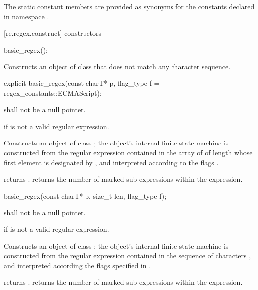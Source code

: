 \pnum
{}%
The static constant members are provided as synonyms for the constants
declared in namespace .

[re.regex.construct]{ constructors}

%
\begin{itemdecl}
basic_regex();
\end{itemdecl}

\begin{itemdescr}
\pnum
\effects  Constructs an object of class  that
does not match any character sequence.
\end{itemdescr}

%
\begin{itemdecl}
explicit basic_regex(const charT* p, flag_type f = regex_constants::ECMAScript);
\end{itemdecl}

\begin{itemdescr}
\pnum
\requires  {} shall not be a null pointer. 

\pnum
\throws  {} if  is not a valid regular expression. 

\pnum
\effects  Constructs an object of class ; the object's
internal finite state machine is constructed from the regular
expression contained in the array of  of length
 whose first element is
designated by , and interpreted according to the flags .

\pnum\postconditions
{} returns .  
 returns the number of marked sub-expressions
within the expression.
\end{itemdescr}

%
\begin{itemdecl}
basic_regex(const charT* p, size_t len, flag_type f);
\end{itemdecl}

\begin{itemdescr}
\pnum
\requires  {} shall not be a null pointer.

\pnum
\throws  {} if  is not a valid regular expression. 

\pnum
\effects  Constructs an object of class ; the object's
internal finite state machine is constructed from the regular
expression contained in the sequence of characters , and
interpreted according the flags specified in . 

\pnum\postconditions
{} returns .  
 returns the number of marked sub-expressions
within the expression.
\end{itemdescr}

